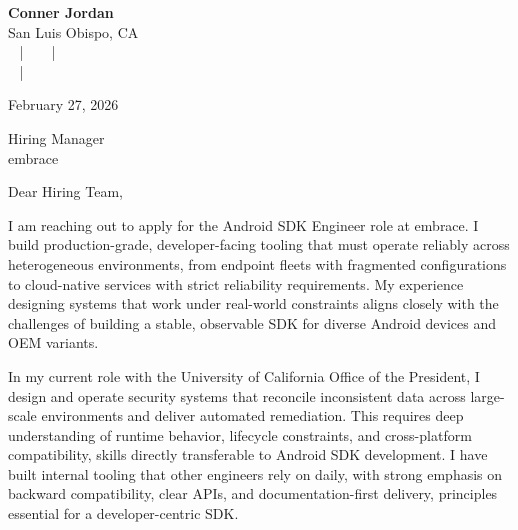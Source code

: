 \documentclass[letterpaper,11pt]{article}
\newcommand{\companyname}{embrace}
\begin{document}
\begin{center}
  {\Huge \textbf{Conner Jordan}}\\[4pt]
  {\Large San Luis Obispo, CA}\\[4pt]
  \href{tel:+18059759793}{
    } ~ | ~
  \href{mailto:connercharlesjordan@gmail.com}{
    } ~ | ~
   \\
  \href{https://www.linkedin.com/in/conner-jordan-4b268514a/}{
    } ~ | ~
  \href{https://github.com/cjordan223}{
    }
\end{center}

\vspace{16pt}

\begin{flushright}
February 27, 2026
\end{flushright}

Hiring Manager\\
\companyname

\vspace{26pt}

\noindent
Dear Hiring Team,

\vspace{16pt}

I am reaching out to apply for the Android SDK Engineer role at \companyname. I build production-grade, developer-facing tooling that must operate reliably across heterogeneous environments, from endpoint fleets with fragmented configurations to cloud-native services with strict reliability requirements. My experience designing systems that work under real-world constraints aligns closely with the challenges of building a stable, observable SDK for diverse Android devices and OEM variants.

\vspace{16pt}

In my current role with the University of California Office of the President, I design and operate security systems that reconcile inconsistent data across large-scale environments and deliver automated remediation. This requires deep understanding of runtime behavior, lifecycle constraints, and cross-platform compatibility, skills directly transferable to Android SDK development. I have built internal tooling that other engineers rely on daily, with strong emphasis on backward compatibility, clear APIs, and documentation-first delivery, principles essential for a developer-centric SDK.
\end{document}
